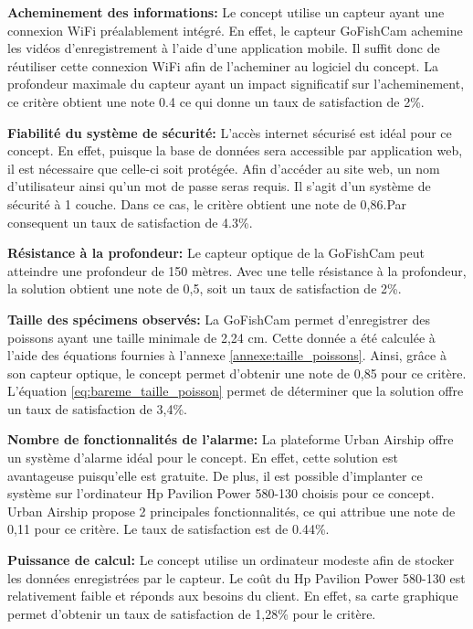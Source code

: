 \textbf{Acheminement des informations:} Le concept utilise un capteur ayant une connexion WiFi préalablement intégré. En effet, le capteur GoFishCam achemine les vidéos d'enregistrement à l'aide d'une application mobile. Il suffit donc de réutiliser cette connexion WiFi afin de l'acheminer au logiciel du concept. La profondeur maximale du capteur ayant un impact significatif sur l'acheminement, ce critère obtient une note 0.4 ce qui donne un taux de satisfaction de 2\%. \vspace{5mm}

\textbf{Fiabilité du système de sécurité:} L'accès internet sécurisé est idéal pour ce concept. En effet, puisque la base de données sera accessible par application web, il est nécessaire que celle-ci soit protégée. Afin d'accéder au site web, un nom d'utilisateur ainsi qu'un mot de passe seras requis. Il s'agit d'un système de sécurité à 1 couche. Dans ce cas, le critère obtient une note de 0,86.Par consequent un taux de satisfaction de 4.3\%.
\vspace{5mm}

\textbf{Résistance à la profondeur:} Le capteur optique de la GoFishCam peut atteindre une profondeur de 150 mètres. Avec une telle résistance à la profondeur, la solution obtient une note de 0,5, soit un taux de satisfaction de 2\%. \vspace{5mm}

\textbf{Taille des spécimens observés:} La GoFishCam permet d'enregistrer des poissons ayant une taille minimale de 2,24 cm. Cette donnée a été calculée à l'aide des équations fournies à l'annexe \ref{annexe:taille_poissons}. Ainsi, grâce à son capteur optique, le concept permet d'obtenir une note de 0,85 pour ce critère. L'équation \ref{eq:bareme_taille_poisson} permet de déterminer que la solution offre un taux de satisfaction de 3,4\%.
\vspace{5mm}

\textbf{Nombre de fonctionnalités de l'alarme:} La plateforme Urban Airship offre un système d'alarme idéal pour le concept. En effet, cette solution est avantageuse puisqu'elle est gratuite. De plus, il est possible d'implanter ce système sur l'ordinateur Hp Pavilion Power 580-130 choisis pour ce concept. Urban Airship propose 2 principales fonctionnalités, ce qui attribue une note de 0,11 pour ce critère. Le taux de satisfaction est de 0.44\%.
\vspace{5mm}

\textbf{Puissance de calcul:} Le concept utilise un ordinateur modeste afin de stocker les données enregistrées par le capteur. Le coût du Hp Pavilion Power 580-130 est relativement faible et réponds aux besoins du client. En effet, sa carte graphique permet d'obtenir un taux de satisfaction de 1,28\% pour le critère. 
\vspace{5mm}

